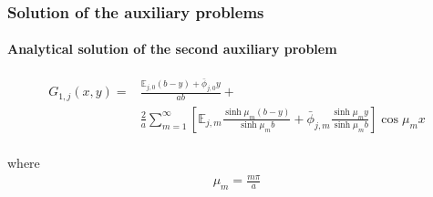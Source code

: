 \documentclass{beamer}
\begin{document}
\begin{frame}
	\frametitle{Solution of the auxiliary problems}
	\framesubtitle{Analytical solution of the second auxiliary problem}
	
	\begin{alertblock}{}
	\begin{align*}	
		G_{1, j}(x, y) = & \frac{\mathbb{E}_{j,0}(b - y) + \bar{\phi}_{j,0}y}{ab} + \nonumber \\
		&\frac{2}{a}\sum_{m=1}^\infty\left[\mathbb{E}_{j,m}\frac{\sinh\mu_m (b - y)}{\sinh\mu_m b} + \bar{\phi}_{j, m}\frac{\sinh\mu_m y}{\sinh\mu_m b}\right]\cos\mu_m x \\
		\end{align*}
	\end{alertblock}	
	
	where
	\begin{align*}
	\mu_m = \frac{m \pi}{a}
	\end{align*}
	
\end{frame}
%
\end{document}
